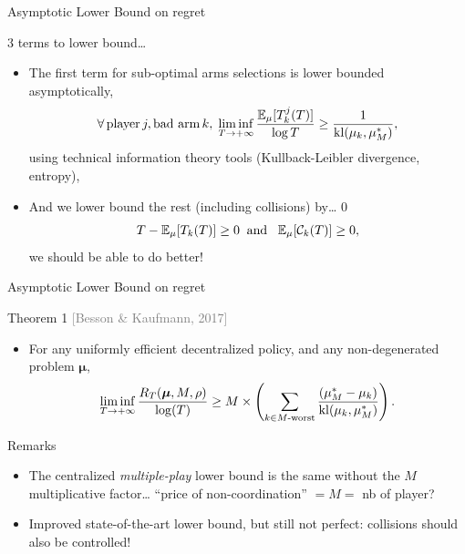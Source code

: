 \documentclass[12pt,english,ignorenonframetext,]{beamer}
\providecommand{\tightlist}{%
  \setlength{\itemsep}{0pt}\setlength{\parskip}{0pt}}
\begin{document}
\begin{frame}{Asymptotic Lower Bound on regret}

\begin{block}{\(3\) terms to lower bound\ldots{}}

\begin{itemize}
\tightlist
\item
  The first term for sub-optimal arms selections is lower bounded
  asymptotically,
  \[\forall\, \text{player}\, j, \text{bad arm}\,k,\; \mathop{\lim\inf}\limits_{T \to +\infty} \frac{\mathbb{E}_{\mu}[T_k^j(T)]}{\log T} \geq \frac{1}{\mathrm{kl}(\mu_k, \mu_M^*)},\]
  using technical information theory tools (Kullback-Leibler divergence,
  entropy),\pause
\item
  And we lower bound the rest (including collisions) by\ldots{} \(0\)
  \[T - \mathbb{E}_{\mu}[T_k(T)] \geq 0 \;\;\text{and}\;\;\; \mathbb{E}_{\mu}[\mathcal{C}_k(T)] \geq 0,\]
  \Sadey[1.4] we should be able to do better!
\end{itemize}

\end{block}

\end{frame}

\begin{frame}{Asymptotic Lower Bound on regret}

\begin{block}{Theorem 1
\hfill{}\textcolor{gray}{[Besson \& Kaufmann, 2017]}}

\begin{itemize}
\tightlist
\item
  For any uniformly efficient decentralized policy, and any
  non-degenerated problem \(\boldsymbol{\mu}\), \vspace*{-10pt}
  \[ \mathop{\lim\inf}\limits_{T \to +\infty} \frac{R_T(\boldsymbol{\mu}, M, \rho)}{\log(T)} \geq M \times \left( \sum_{k \in M\text{-}\mathrm{worst}} \frac{(\mu_M^* -  \mu_k)}{\mathrm{kl}(\mu_k, \mu_M^*)} \right) . \]
\end{itemize}

\pause

\end{block}

\begin{block}{Remarks}

\begin{itemize}
\tightlist
\item
  The centralized \emph{multiple-play} lower bound is the same without
  the \(M\) multiplicative factor\ldots{}
  \hook \alert{``price of non-coordination''} \(= M =\) nb of player?
\item
  Improved state-of-the-art lower bound, but still not perfect:
  collisions should also be controlled!
\end{itemize}

\end{block}

\end{frame}
\end{document}
